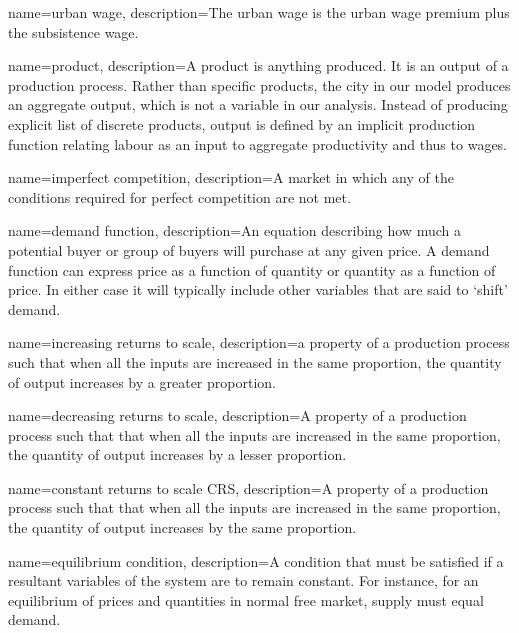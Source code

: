 {
name=urban wage,
description={The \gls{urban wage} is the \gls{urban wage premium} plus the \gls{subsistence wage}.}
}

{
name=product,
description={A product is anything produced. It is an \gls{output} of a production process. %
Rather than specific products, the city in our model produces an aggregate output, which is not a variable in our analysis. Instead of producing explicit list of discrete products, output is defined by an implicit production function relating labour as an input to aggregate productivity and thus to wages. %
}
}

{
name=imperfect competition,
description={A market in which any of the conditions required for \gls{perfect competition} are not met.}
}

{
name=demand function,
description={An equation describing how much a potential buyer or group of buyers will purchase at any given price. A demand function can express price as a function of quantity or quantity as a function of price. In either case it will typically include other variables that are said to `shift' demand.}
}

{
name=increasing returns to scale,
description={a property of a production process  such that when all the inputs are increased in the same proportion, the quantity of \gls{output} increases by a greater proportion.}
}

{
name=decreasing returns to scale,
description={A property of a production process such that that when all the inputs are increased in the same proportion, the quantity of \gls{output} increases by a lesser proportion.}
}

{
name=constant returns to scale \gls{CRS},
description={A property of a production process such that that when all
the \glspl{input} are increased in the same proportion, the quantity of \gls{output} increases by the same proportion.}
}

{
name=equilibrium condition,
description={A condition that must be satisfied if a resultant variables of the system are to remain constant. For instance, for an equilibrium of prices and quantities in normal free \gls{market}, supply must equal demand.} %
}

